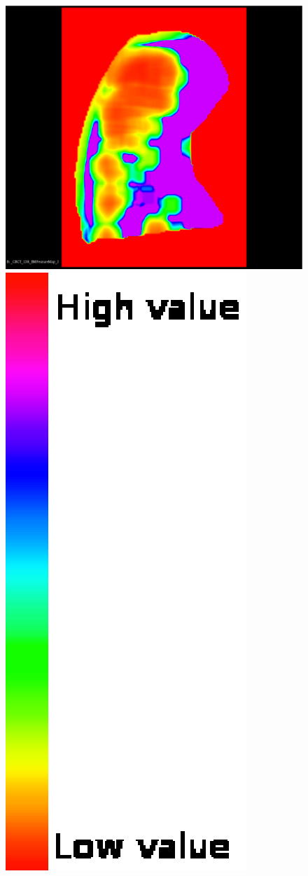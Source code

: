 \documentclass{InsightArticle}
\begin{document}
\begin{figure}[H]
\begin{center}
    \includegraphics[scale=0.115]{figures/TbTh.eps}
    \includegraphics[scale=0.385]{figures/discreteFullRainbow.eps}

\end{center}
\end{figure}
\end{document}
